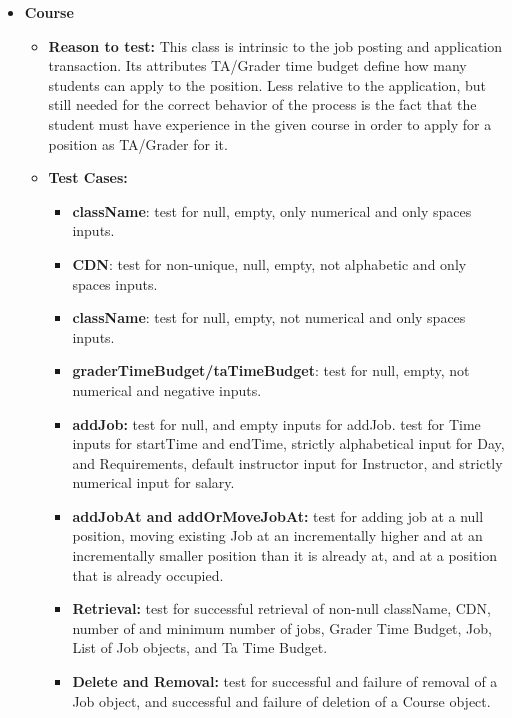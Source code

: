 \documentclass[12pt]{report}
\begin{document}
    \begin{itemize}
        \item \textbf{Course}
        \begin{itemize}
            \item \textbf{Reason to test:} This class is intrinsic to the job posting and application transaction. Its attributes TA/Grader time budget define how many students can apply to the position. Less relative to the application, but still needed for the correct behavior of the process is the fact that the student must have experience in the given course in order to apply for a position as TA/Grader for it.
            \item \textbf{Test Cases:} 
            \begin{itemize}
                \item \textbf{className}: test for null, empty, only numerical and only spaces inputs.
                \item \textbf{CDN}: test for non-unique, null, empty, not alphabetic and only spaces inputs.
                \item \textbf{className}: test for null, empty, not numerical and only spaces inputs.
                \item \textbf{graderTimeBudget/taTimeBudget}: test for null, empty, not numerical and negative inputs.
                \item \textbf{addJob:} test for null, and empty inputs for addJob. test for Time inputs for startTime and endTime, strictly alphabetical input for Day, and Requirements, default instructor input for Instructor, and strictly numerical input for salary.
                \item \textbf{addJobAt and addOrMoveJobAt:} test for adding job at a null position, moving existing Job at an incrementally higher and at an incrementally smaller position than it is already at, and at a position that is already occupied.
                \item \textbf{Retrieval:} test for successful retrieval of non-null className, CDN, number of and minimum number of jobs, Grader Time Budget, Job, List of Job objects, and Ta Time Budget.
                \item \textbf{Delete and Removal:} test for successful and failure of removal of a Job object, and successful and failure of deletion of a Course object.
            \end{itemize}
        \end{itemize}
        

\end{itemize}
\end{document}
